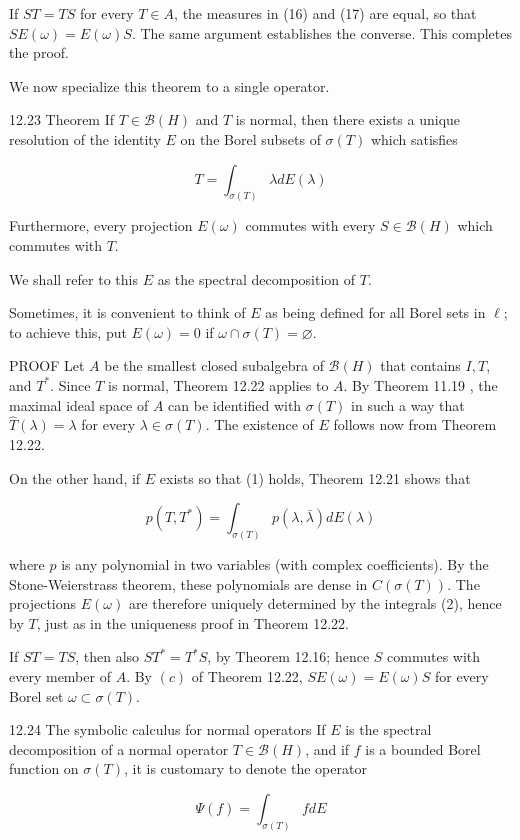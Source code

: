 \documentclass[10pt]{article}
\begin{document}
If $S T=T S$ for every $T \in A$, the measures in (16) and (17) are equal, so that $S E(\omega)=E(\omega) S$. The same argument establishes the converse. This completes the proof.

We now specialize this theorem to a single operator.

12.23 Theorem If $T \in \mathscr{B}(H)$ and $T$ is normal, then there exists a unique resolution of the identity $E$ on the Borel subsets of $\sigma(T)$ which satisfies

$$
T=\int_{\sigma(T)} \lambda d E(\lambda)
$$

Furthermore, every projection $E(\omega)$ commutes with every $S \in \mathscr{B}(H)$ which commutes with $T$.

We shall refer to this $E$ as the spectral decomposition of $T$.

Sometimes, it is convenient to think of $E$ as being defined for all Borel sets in $\ell$; to achieve this, put $E(\omega)=0$ if $\omega \cap \sigma(T)=\varnothing$.

PROOF Let $A$ be the smallest closed subalgebra of $\mathscr{B}(H)$ that contains $I, T$, and $T^{*}$. Since $T$ is normal, Theorem 12.22 applies to $A$. By Theorem 11.19 , the maximal ideal space of $A$ can be identified with $\sigma(T)$ in such a way that $\widehat{T}(\lambda)=\lambda$ for every $\lambda \in \sigma(T)$. The existence of $E$ follows now from Theorem 12.22.

On the other hand, if $E$ exists so that (1) holds, Theorem 12.21 shows that

$$
p\left(T, T^{*}\right)=\int_{\sigma(T)} p(\lambda, \bar{\lambda}) d E(\lambda)
$$

where $p$ is any polynomial in two variables (with complex coefficients). By the Stone-Weierstrass theorem, these polynomials are dense in $C(\sigma(T))$. The projections $E(\omega)$ are therefore uniquely determined by the integrals (2), hence by $T$, just as in the uniqueness proof in Theorem 12.22.

If $S T=T S$, then also $S T^{*}=T^{*} S$, by Theorem 12.16; hence $S$ commutes with every member of $A$. By $(c)$ of Theorem 12.22, $S E(\omega)=E(\omega) S$ for every Borel set $\omega \subset \sigma(T)$.

12.24 The symbolic calculus for normal operators If $E$ is the spectral decomposition of a normal operator $T \in \mathscr{B}(H)$, and if $f$ is a bounded Borel function on $\sigma(T)$, it is customary to denote the operator

$$
\Psi(f)=\int_{\sigma(T)} f d E
$$
\end{document}

